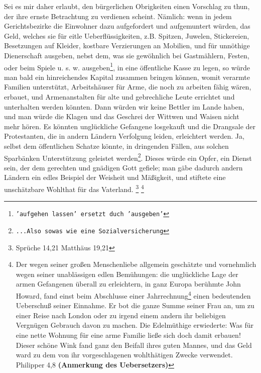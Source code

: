 Sei es mir daher erlaubt, den bürgerlichen Obrigkeiten einen Vorschlag zu thun,
der ihre ernste Betrachtung zu verdienen scheint. Nämlich: wenn in jedem
Gerichtsbezirke die Einwohner dazu aufgefordert und aufgemuntert würden, das
Geld, welches sie für eitle Ueberflüssigkeiten, z.B. Spitzen, Juwelen,
Stickereien, Besetzungen auf Kleider, kostbare Verzierungen an Mobilien, und für
unnöthige Dienerschaft ausgeben, nebst dem, was sie gewöhnlich bei Gastmählern,
Festen, oder beim Spiele u. s. w. ausgeben\footnote{\texttt{'aufgehen lassen'
ersetzt duch 'ausgeben'}}, in eine öffentliche Kasse zu
legen, so würde man bald ein hinreichendes Kapital zusammen bringen können,
womit verarmte Familien unterstützt, Arbeitshäuser für Arme, die noch zu
arbeiten fähig wären, erbauet, und Armenanstalten für alte und
gebrechliche
Leute errichtet und unterhalten werden könnten. Dann
würden wir keine Bettler im Lande haben, und man würde die Klagen
und das
Geschrei der Wittwen und Waisen nicht mehr hören. Es könnten unglückliche
Gefangene losgekauft und die Drangsale der Protestanten, die in andern Ländern
Verfolgung leiden, erleichtert werden. Ja,
selbst dem öffentlichen Schatze könnte, in dringenden
Fällen, aus solchen
Sparbänken Unterstützung geleistet werden\footnote{\texttt{...Also sowas wie
eine Sozialversicherung}}. Dieses würde ein Opfer, ein Dienst
sein, der dem gerechten und gnädigen Gott gefiele; man gäbe dadurch andern
Ländern ein edles Beispiel der Weisheit und Mäßigkeit, und stiftete eine
unschätzbare Wohlthat für das Vaterland.
\footnote{Sprüche 14,21
Matthäus 19,21}
\footnote{Der wegen seiner großen
Menschenliebe allgemein geschätzte und vornehmlich wegen seiner unablässigen
edlen Bemühungen: die unglückliche Lage der armen Gefangenen überall zu
erleichtern, in ganz Europa berühmte John Howard,
fand einst beim Abschlusse
einer Jahrrechnung\footnote{\texttt{...Also Jahresbilanz}} einen bedeutenden
Ueberschuß seiner Einnahme. Er bot die
ganze Summe seiner Frau an, um zu einer Reise nach London
oder zu irgend
einem andern ihr beliebigen Vergnügen Gebrauch davon zu machen. Die Edelmüthige
erwiederte: Was für eine nette Wohnung für eine arme Familie ließe sich doch
damit erbauen! Dieser schöne Wink fand ganz den Beifall
ihres guten Mannes, und das Geld ward zu dem von ihr vorgeschlagenen
wohlthätigen Zwecke verwendet. Philipper 4,8
\textbf{(Anmerkung des Uebersetzers)}}

